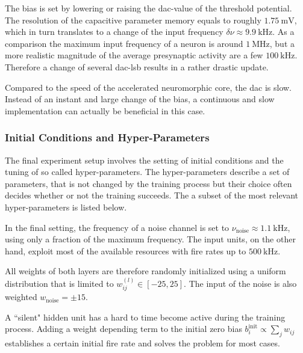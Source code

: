 The bias is set by lowering or raising the \gls{dac}-value of the threshold potential. The resolution of the capacitive parameter memory equals to roughly $\SI{1.75}{\milli \V}$, which in turn translates to a change of the input frequency $\delta \nu \approx \SI{9.9}{\kilo \Hz}$. As a comparison the maximum input frequency of a neuron is around $\SI{1}{\mega \Hz}$, but a more realistic magnitude of the average presynaptic activity are a few $\SI{100}{\kilo \Hz}$. Therefore a change of several \gls{dac}-lsb results in a rather drastic update. 

Compared to the speed of the accelerated neuromorphic core, the \acrlong{dac} is slow. Instead of an instant and large change of the bias, a continuous and slow implementation can actually be beneficial in this case.

\subsubsection*{Initial Conditions and Hyper-Parameters}
The final experiment setup involves the setting of initial conditions and the tuning of so called hyper-parameters. The hyper-parameters describe a set of parameters, that is not changed by the training process but their choice often decides whether or not the training succeeds. The a subset of the most relevant hyper-parameters is listed below.

In the final setting, the frequency of a noise channel is set to $\nu_\text{noise} \approx \SI{1.1}{\kilo \Hz}$, using only a fraction of the maximum frequency. The input units, on the other hand, exploit most of the available resources with fire rates up to $\SI{500}{\kilo \Hz}$.

All weights of both layers are therefore randomly initialized using a uniform distribution that is limited to $w_{ij}^{(l)} \in [-25, 25]$. The input of the noise is also weighted $w_\text{noise} = \pm 15$.

A ``silent" hidden unit has a hard to time become active during the training process. Adding a weight depending term to the initial zero bias $b_i^\text{init} \propto \sum_j w_{ij}$ establishes a certain initial fire rate and solves the problem for most cases.

